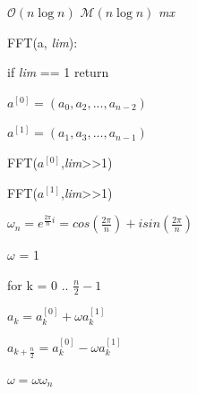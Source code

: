 \documentclass{article}
\begin{document}
$\mathcal{O}(n\log{}n)$
$\mathcal{M}(n\log{}n)$
\emph{mx}

FFT(a, \emph{lim}):

  \qquad if \emph{lim} == 1 return

  \qquad $a^{[0]} = (a_0,a_2,...,a_{n-2})$

  \qquad $a^{[1]} = (a_1,a_3,...,a_{n-1})$  

  \qquad FFT($a^{[0]}$,\emph{lim}>>1)  

  \qquad FFT($a^{[1]}$,\emph{lim}>>1)  

  \qquad $\omega_n = e^{\frac{2\pi}{n}i} = cos(\frac{2\pi}{n}) + isin(\frac{2\pi}{n})$  

  \qquad $\omega$ = 1  

  \qquad for k = 0 .. $\frac{n}{2} -1$  

      \qquad\qquad $a_k = a^{[0]}_k + \omega a^{[1]}_k$  

      \qquad\qquad $a_{k+\frac{n}{2}} = a^{[0]}_k - \omega a^{[1]}_k$  

      \qquad\qquad $\omega = \omega\omega_n$  



\newpage
\end{document}
